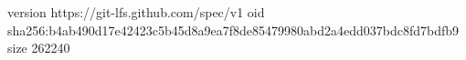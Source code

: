 version https://git-lfs.github.com/spec/v1
oid sha256:b4ab490d17e42423c5b45d8a9ea7f8de85479980abd2a4edd037bdc8fd7bdfb9
size 262240
